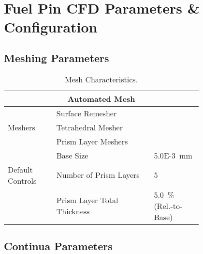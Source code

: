 \documentclass[8pt,a5paper]{article}
\begin{document}
\small


\centering

\section*{Fuel Pin CFD Parameters \& Configuration}

\raggedright

\subsection*{Meshing Parameters}

\vspace{-0.25in}

\begin{table}[h!]
    \label{table: Table 1}
    \centering
    \small
    \caption{Mesh Characteristics.}
    \begin{tabular}{|m{0.2\linewidth}|m{0.4\linewidth}|m{0.2\linewidth}|}
    \hline
    \multicolumn{3}{|c|}{\textbf{Automated Mesh}}\\\hline
    & \multicolumn{2}{l|}{Surface Remesher}\\\cline{2-3}
    Meshers & \multicolumn{2}{l|}{Tetrahedral Mesher}\\\cline{2-3}
    & \multicolumn{2}{l|}{Prism Layer Meshers}\\\hline
    & Base Size & \SI{5.0E-3}{mm}\\\cline{2-3}
    Default Controls & Number of Prism Layers & \SI{5}{}\\\cline{2-3}
    & Prism Layer Total Thickness & \SI{5.0}{\%} (Rel.-to-Base)\\\hline
    \end{tabular}
\end{table}

\subsection*{Continua Parameters}

\vspace{-0.25in}
\end{document}
